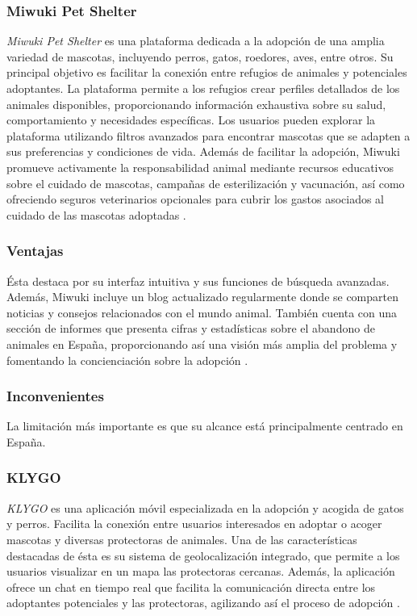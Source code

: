 \documentclass[a4paper, 12pt]{article}
\begin{document}
\subsubsection*{Miwuki Pet Shelter}

\textit{Miwuki Pet Shelter} es una plataforma dedicada a la adopción de una amplia variedad de mascotas, incluyendo perros, gatos, roedores, aves, entre otros. Su principal objetivo es facilitar la conexión entre refugios de animales y potenciales adoptantes. La plataforma permite a los refugios crear perfiles detallados de los animales disponibles, proporcionando información exhaustiva sobre su salud, comportamiento y necesidades específicas. Los usuarios pueden explorar la plataforma utilizando filtros avanzados para encontrar mascotas que se adapten a sus preferencias y condiciones de vida. Además de facilitar la adopción, Miwuki promueve activamente la responsabilidad animal mediante recursos educativos sobre el cuidado de mascotas, campañas de esterilización y vacunación, así como ofreciendo seguros veterinarios opcionales para cubrir los gastos asociados al cuidado de las mascotas adoptadas \cite{miwuki}.

\subsubsection*{Ventajas}

Ésta destaca por su interfaz intuitiva y sus funciones de búsqueda avanzadas. Además, Miwuki incluye un blog actualizado regularmente donde se comparten noticias y consejos relacionados con el mundo animal. También cuenta con una sección de informes que presenta cifras y estadísticas sobre el abandono de animales en España, proporcionando así una visión más amplia del problema y fomentando la concienciación sobre la adopción \cite{lookerstudio}.

\subsubsection*{Inconvenientes}

La limitación más importante es que su alcance está principalmente centrado en España.

\subsubsection*{KLYGO}
\textit{KLYGO} es una aplicación móvil especializada en la adopción y acogida de gatos y perros. Facilita la conexión entre usuarios interesados en adoptar o acoger mascotas y diversas protectoras de animales. Una de las características destacadas de ésta es su sistema de geolocalización integrado, que permite a los usuarios visualizar en un mapa las protectoras cercanas. Además, la aplicación ofrece un chat en tiempo real que facilita la comunicación directa entre los adoptantes potenciales y las protectoras, agilizando así el proceso de adopción \cite{klygo}.
\end{document}
